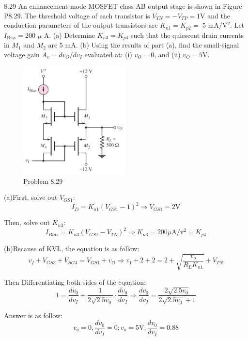 \documentclass[a4paper,11pt,UTF8]{article}
\begin{document}
8.29 An enhancement-mode MOSFET class-AB output stage is shown in Figure P8.29. The threshold voltage of each transistor is $V_{TN}=-V_{TP}=1$V and the conduction parameters of the output transistors are $K_{n1}=K_{p2}=$
5 mA/V$^{2}$. Let $I_{\text{Bias}}=200$ $\mu$ A. (a) Determine $K_{n3}=K_{p4}$ such that the quiescent drain currents in $M_1$ and $M_2$ are 5 mA. (b) Using the results of part (a), find the small-signal voltage gain $A_v=dv_O/dv_I$ evaluated at: (i) $v_O=0$, and (ii) $v_O=5$V.
\begin{figure}[H]
	\centering
	\includegraphics[width=0.5\textwidth]{8.29}
	\caption{Problem 8.29}
\end{figure}
(a)First, solve out $V_{GS1}$:
$$
	I_D=K_{n1}(V_{GS1}-1)^2\Rightarrow V_{GS1}=2\mathrm{V}
$$

Then, solve out $K_{n3}$:
$$
	I_{Bias}=K_{n3}(V_{GS1}-V_{TN})^2\Rightarrow K_{n3}=200\mu\mathrm{A/v^2}=K_{p4}
$$

(b)Because of KVL, the equation is as follow:
$$
	v_I+V_{GS3}+V_{SG4}=V_{GS1}+v_O\Rightarrow v_I+2+2=2+\sqrt{\frac{v_{o}}{R_{L}K_{n1}}}+V_{TN}
$$

Then Differentiating both sides of the equation:
$$
	1=\frac{dv_0}{dv_I}+\displaystyle\frac{1}{2\sqrt{2.5v_0}}\cdot\frac{dv_0}{dv_I}\Rightarrow \frac{dv_0}{dv_I}=\frac{2\sqrt{2.5v_0}}{2\sqrt{2.5v_0}+1}
$$

Answer is as follow:
$$v_o=0,\frac{dv_0}{dv_I}=0;v_o=5\mathrm{V},\frac{dv_0}{dv_I}=0.88$$
\end{document}
